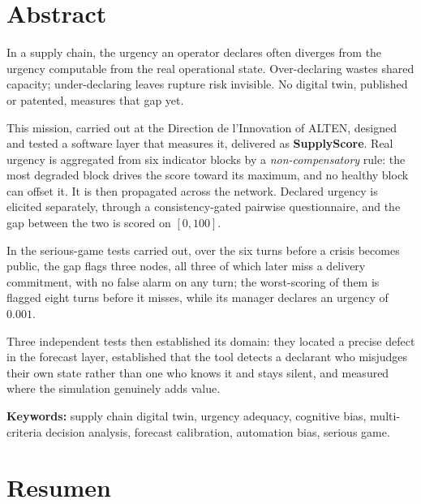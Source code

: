 \section*{Abstract}
\label{sec:resume_en}

In a supply chain, the urgency an operator declares often diverges from the urgency computable
from the real operational state. Over-declaring wastes shared capacity; under-declaring leaves
rupture risk invisible. No digital twin, published or patented, measures that gap yet.

This mission, carried out at the Direction de l'Innovation of ALTEN, designed and tested a
software layer that measures it, delivered as \textbf{SupplyScore}. Real urgency is
aggregated from six indicator blocks by a
\emph{non-compensatory} rule: the most degraded block drives the score toward its maximum, and
no healthy block can offset it. It is then propagated across the network. Declared urgency is
elicited separately, through a consistency-gated pairwise questionnaire, and the gap between
the two is scored on $[0,100]$.

In the serious-game tests carried out, over the six turns before a crisis becomes public, the
gap flags three nodes, all three of which later miss a delivery commitment, with no false alarm
on any turn; the worst-scoring of them is flagged eight turns before it misses, while its
manager declares an urgency of $0.001$.

Three independent tests then established its domain: they located a precise defect in the
forecast layer, established that the tool detects a declarant who misjudges their own
state rather than one who knows it and stays silent, and measured where the simulation
genuinely adds value.

\medskip

\noindent\textbf{Keywords:} supply chain digital twin, urgency adequacy, cognitive bias,
multi-criteria decision analysis, forecast calibration, automation bias, serious game.

\vspace{0.3cm}

\section*{Resumen}
\label{sec:resume_es}

